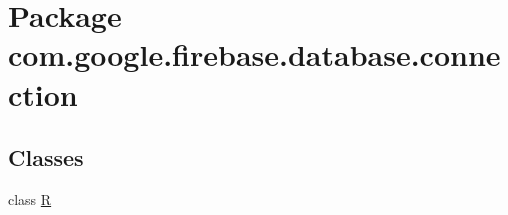 \hypertarget{namespacecom_1_1google_1_1firebase_1_1database_1_1connection}{}\section{Package com.\+google.\+firebase.\+database.\+connection}
\label{namespacecom_1_1google_1_1firebase_1_1database_1_1connection}
\subsection*{Classes}
\begin{DoxyCompactItemize}
\item 
class \mbox{\hyperlink{classcom_1_1google_1_1firebase_1_1database_1_1connection_1_1R}{R}}
\end{DoxyCompactItemize}
